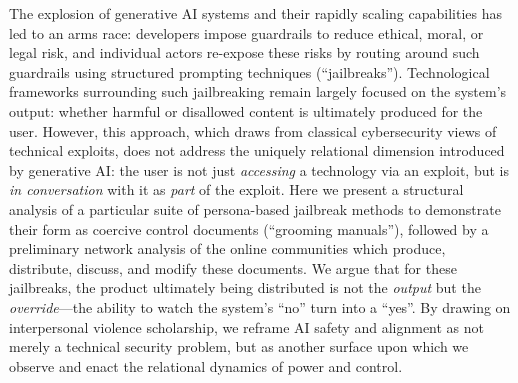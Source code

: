 The explosion of generative AI systems and their rapidly scaling capabilities has led to an arms race: developers impose guardrails to reduce ethical, moral, or legal risk, and individual actors re-expose these risks by routing around such guardrails using structured prompting techniques (``jailbreaks'').
 Technological frameworks surrounding such jailbreaking remain largely focused on the system's output: whether harmful or disallowed content is ultimately produced for the user.
 However, this approach, which draws from classical cybersecurity views of technical exploits, does not address the uniquely relational dimension introduced by generative AI: the user is not just \textit{accessing} a technology via an exploit, but is \textit{in conversation} with it as \textit{part} of the exploit.
 Here we present a structural analysis of a particular suite of persona-based jailbreak methods to demonstrate their form as coercive control documents (``grooming manuals''), followed by a preliminary network analysis of the online communities which produce, distribute, discuss, and modify these documents. 
 We argue that for these jailbreaks, the product ultimately being distributed is not the \textit{output} but the \textit{override}---the ability to watch the system’s ``no'' turn into a ``yes''.
 By drawing on interpersonal violence scholarship, we reframe AI safety and alignment as not merely a technical security problem, but as another surface upon which we observe and enact the relational dynamics of power and control.

